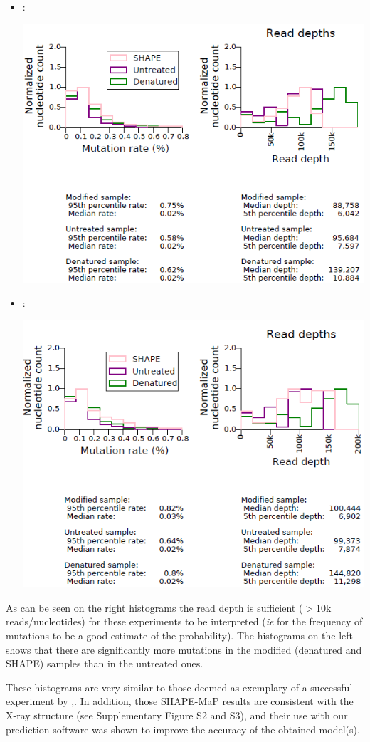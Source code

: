 \documentclass[9pt,hyperref]{article} %
\begin{document}
\begin{enumerate}
{\begin{itemize}
	\item \NMIAMg:

	{\centering\includegraphics[width=.8\linewidth]{graphs/didy/NMIA-Mg}\\}

	\item \OneMSevILUThree:
	
	{\centering\includegraphics[width=.8\linewidth]{graphs/didy/1M7}\\}

	\end{itemize}
	
	As can be seen on the right  histograms the read depth is sufficient ($>$10k reads/nucleotides) for these experiments to be interpreted (\emph{ie} for the frequency of mutations to be a good estimate of the probability). The histograms on the left shows that there are significantly more mutations in the modified (denatured and SHAPE) samples than in the untreated ones. 
	
	These histograms are very similar to those deemed as exemplary of a successful experiment by \cite{Smola2015},. 
	In addition, those SHAPE-MaP results are consistent with the X-ray structure (see Supplementary Figure S2 and S3), and their use with our prediction software was shown to improve the accuracy of the obtained model(s). 
	
}
\end{enumerate}
\end{document}
